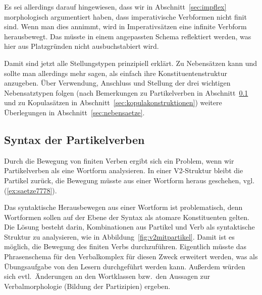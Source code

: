 Es sei allerdings darauf hingewiesen, dass wir in Abschnitt~\ref{sec:impflex} morphologisch argumentiert haben, dass imperativische Verbformen nicht finit sind.
Wenn man dies annimmt, wird in Imperativsätzen eine infinite Verbform herausbewegt.
Das müsste in einem angepassten Schema reflektiert werden, was hier aus Platzgründen nicht ausbuchstabiert wird.


Damit sind jetzt alle Stellungstypen prinzipiell erklärt.
Zu Nebensätzen kann und sollte man allerdings mehr sagen, als einfach ihre Konstituentenstruktur anzugeben.
Über Verwendung, Anschluss und Stellung der drei wichtigen Nebensatztypen folgen (nach Bemerkungen zu Partikelverben in Abschnitt~\ref{sec:partikelverben} und zu Kopulasätzen in Abschnitt~\ref{sec:kopulakonstruktionen}) weitere Überlegungen in Abschnitt~\ref{sec:nebensaetze}.

\subsection{Syntax der Partikelverben}

\label{sec:partikelverben}

Durch die Bewegung von finiten Verben ergibt sich ein Problem, wenn wir Partikelverben als eine Wortform analysieren.
In einer V2-Struktur bleibt die Partikel zurück, die Bewegung müsste aus einer Wortform heraus geschehen, vgl. (\ref{ex:saetze7778}).

\begin{exe}
\end{exe}


Das syntaktische Herausbewegen aus einer Wortform ist problematisch, denn Wortformen sollen auf der Ebene der Syntax als atomare Konstituenten gelten.
Die Lösung besteht darin, Kombinationen aus Partikel und Verb als syntaktische Struktur zu analysieren, wie in Abbildung~\ref{fig:v2mitpartikel}.
Damit ist es möglich, die Bewegung des finiten Verbs durchzuführen.
Eigentlich müsste das Phrasenschema für den Verbalkomplex für diesen Zweck erweitert werden, was als Übungsaufgabe von den Lesern durchgeführt werden kann.
Außerdem würden sich evtl.\ Änderungen an den Wortklassen bzw.\ den Aussagen zur Verbalmorphologie (\zB Bildung der Partizipien) ergeben.

